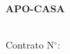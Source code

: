 %
%

\textsf{\vspace{6cm}}
\begin{center}
  \noindent
  \large{
    \textbf{\titulo}
  } \\

  \Large{
    \textbf{\subtitulo}
  } \\
  \large{
    \textbf{APO-CASA}
  }

  \vspace{9cm}

  \large{
    \textbf{\autor}\\
    \textsf{Contrato N$^{\circ}$: \numcontrato}\\
  }
\end{center}
\cfoot{}

%
%
